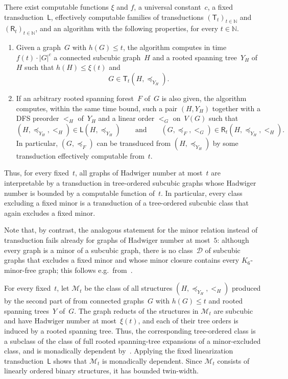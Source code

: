 \documentclass[1p,number,11pt]{elsarticle}
\theoremstyle{plain}
\newcommand{\Dd}{\mathscr{D}}
\renewcommand{\leq}{\leqslant}
\begin{document}
\begin{theorem}\label{thm:minor-transduction}
There exist computable functions $\xi$ and $f$, a universal constant~$c$, a fixed transduction~$\mathsf L$, effectively computable families of transductions $(\mathsf T_t)_{t\in\mathbb N}$ and $(\mathsf R_t)_{t\in\mathbb N}$, and an algorithm with the following properties, for every $t\in\mathbb N$.
\begin{enumerate}[nosep]
    \item Given a graph~$G$ with $h(G)\leq t$, the algorithm computes in time $f(t)\cdot |G|^c$ a connected subcubic graph~$H$ and a rooted spanning tree~$Y_H$ of~$H$ such that $h(H)\leq\xi(t)$ and
    \[
        G\in\mathsf T_t(H,\preceq_{Y_H}).
    \]
    \item If an arbitrary rooted spanning forest~$F$ of~$G$ is also given, the algorithm computes, within the same time bound, such a pair $(H,Y_H)$ together with a DFS preorder $<_H$ of~$Y_H$ and a linear order $<_G$ on~$V(G)$ such that
    \[
        (H,\preceq_{Y_H},<_H)\in\mathsf L(H,\preceq_{Y_H})
        \qquad\text{and}\qquad
        (G,\preceq_F,{<_G})\in\mathsf R_t(H,\preceq_{Y_H},<_H).
    \]
    In particular, $(G,\preceq_F)$ can be transduced from $(H,\preceq_{Y_H})$ by some transduction effectively computable from~$t$.
\end{enumerate}
\end{theorem}

Thus, for every fixed~$t$, all graphs of Hadwiger number at most~$t$ are
interpretable by a transduction in tree-ordered subcubic graphs
whose Hadwiger number is bounded by a computable function of~$t$. In
particular, every class excluding a fixed minor is a transduction of a
tree-ordered subcubic class that again excludes a fixed minor.

Note that, by contrast, the analogous statement for the minor relation instead of transduction fails already for graphs of Hadwiger number at most~$5$: although every graph is a minor of a subcubic graph, there is no class~$\Dd$ of subcubic graphs that excludes a fixed minor and whose minor closure contains every $K_6$-minor-free graph; this follows e.g.\ from~\cite[Theorem~17]{MilolidakisThesis}.



For every fixed~$t$, let $\mathscr M_t$ be the class of all structures
$(H,\preceq_{Y_H},<_H)$ produced by the second part of
 from connected graphs~$G$ with $h(G)\leq t$
and rooted spanning trees~$Y$ of~$G$. The graph reducts of the structures in
$\mathscr M_t$ are subcubic and have Hadwiger number at most~$\xi(t)$, and
each of their tree orders is induced by a rooted spanning tree. Thus, the
corresponding tree-ordered class is a subclass of the class of full rooted
spanning-tree expansions of a minor-excluded class, and is
monadically dependent by~. Applying the fixed
linearization transduction~$\mathsf L$ shows that $\mathscr M_t$ is
monadically dependent. Since $\mathscr M_t$ consists of linearly ordered
binary structures, it has bounded twin-width.
\end{document}
